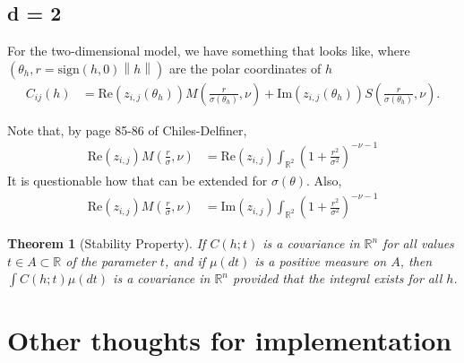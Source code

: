 \documentclass[11pt]{article}
\newtheorem{theorem}{Theorem}
\begin{document}
\subsection{d = 2}

For the two-dimensional model, we have something that looks like, where $(\theta_h, r =\textrm{sign}(h, 0) \left\lVert h\right\rVert )$ are the polar coordinates of $h$ \begin{align*}
C_{ij}(h) &=\textrm{Re}(z_{i,j}(\theta_h)) M\left( \frac{r }{\sigma(\theta_h)}, \nu\right) + \textrm{Im}(z_{i,j}(\theta_h))S\left(\frac{r }{\sigma(\theta_h)} , \nu\right).  %
\end{align*}

Note that, by page 85-86 of Chiles-Delfiner, \begin{align*}
\textrm{Re}(z_{i,j}) M\left( \frac{r }{\sigma}, \nu\right) &=\textrm{Re}(z_{i,j}) \int_{\mathbb{R}^2} \left( 1+ \frac{r^2}{\sigma^2}\right)^{-\nu - 1}
\end{align*}
It is questionable how that can be extended for $\sigma(\theta)$. Also, \begin{align*}
\textrm{Re}(z_{i,j}) M\left( \frac{r }{\sigma}, \nu\right) &=\textrm{Im}(z_{i,j}) \int_{\mathbb{R}^2} \left( 1+ \frac{r^2}{\sigma^2}\right)^{-\nu - 1}
\end{align*}

%


\begin{theorem}[Stability Property]
If $C(h; t)$ is a covariance in $\mathbb{R}^n$ for all values $t \in A \subset \mathbb{R}$ of the parameter $t$, and if $\mu(dt)$ is a positive measure on $A$, then $\int C(h;t) \mu(dt)$ is a covariance in $\mathbb{R}^n$ provided that the integral exists for all $h$.
\end{theorem}


\section{Other thoughts for implementation}
\end{document}
